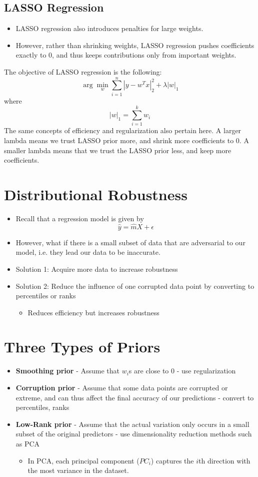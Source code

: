 \documentclass{article}
\begin{document}
\subsection{LASSO Regression}
\begin{itemize}
    \item LASSO regression also introduces penalties for large weights.
    \item However, rather than shrinking weights, LASSO regression pushes coefficients exactly to 0, and thus keeps contributions only from important weights.
\end{itemize}
The objective of LASSO regression is the following:
\[
    \arg\min_w \sum_{i=1}^n|y-w^Tx|^2_2 + \lambda |w|_1
\]
where
\[
    |w|_1 = \sum_{i=1}^k w_i
\]
The same concepts of efficiency and regularization also pertain here. A larger lambda means we trust LASSO prior more, and shrink more coefficients to 0. A smaller lambda means that we trust the LASSO prior less, and keep more coefficients.

\section{Distributional Robustness}
\begin{itemize}
    \item Recall that a regression model is given by 
    \[
        \hat{y} = \hat{m}X + \epsilon
    \]
    \item However, what if there is a small subset of data that are adversarial to our model, i.e. they lead our data to be inaccurate.
    \item Solution 1: Acquire more data to increase robustness
    \item Solution 2: Reduce the influence of one corrupted data point by converting to percentiles or ranks
        \begin{itemize}
            \item Reduces efficiency but increases robustness
        \end{itemize}
\end{itemize}

\newpage
\section{Three Types of  Priors}
\begin{itemize}
    \item \textbf{Smoothing prior} - Assume that $w_i$s are close to 0 - use regularization
    \item \textbf{Corruption prior} - Assume that some data points are corrupted or extreme, and can thus affect the final accuracy of our predictions - convert to percentiles, ranks
    \item \textbf{Low-Rank prior} - Assume that the actual variation only occurs in a small subset of the original predictors - use dimensionality reduction methods such as PCA
    \begin{itemize}
        \item In PCA, each principal component ($PC_i$) captures the $i$th direction with the most variance in the dataset.
    \end{itemize}
\end{itemize}
\end{document}
